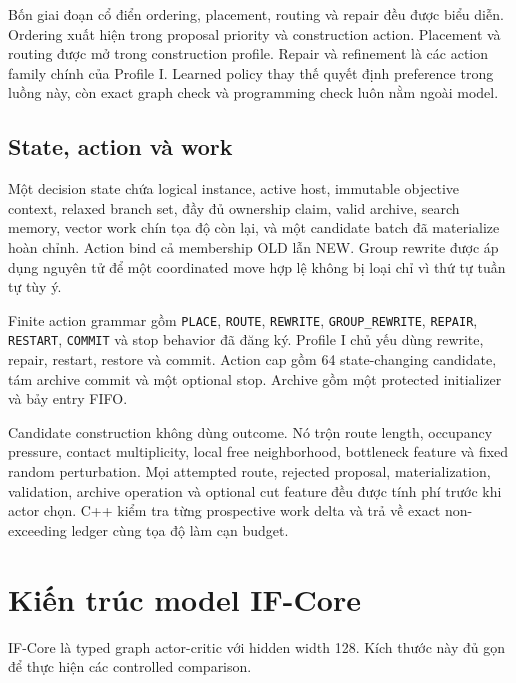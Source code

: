 \documentclass[
  vietnamese,
  10pt,
  a4paper,
]{article}
\begin{document}
Bốn giai đoạn cổ điển ordering, placement, routing và repair đều được
biểu diễn. Ordering xuất hiện trong proposal priority và construction
action. Placement và routing được mở trong construction profile. Repair
và refinement là các action family chính của Profile I. Learned policy
thay thế quyết định preference trong luồng này, còn exact graph check và
programming check luôn nằm ngoài model.

\subsection{State, action và work}\label{state-action-vuxe0-work}

Một decision state chứa logical instance, active host, immutable
objective context, relaxed branch set, đầy đủ ownership claim, valid
archive, search memory, vector work chín tọa độ còn lại, và một
candidate batch đã materialize hoàn chỉnh. Action bind cả membership OLD
lẫn NEW. Group rewrite được áp dụng nguyên tử để một coordinated move
hợp lệ không bị loại chỉ vì thứ tự tuần tự tùy ý.

Finite action grammar gồm \texttt{PLACE}, \texttt{ROUTE},
\texttt{REWRITE}, \texttt{GROUP\_REWRITE}, \texttt{REPAIR},
\texttt{RESTART}, \texttt{COMMIT} và stop behavior đã đăng ký. Profile I
chủ yếu dùng rewrite, repair, restart, restore và commit. Action cap gồm
64 state-changing candidate, tám archive commit và một optional stop.
Archive gồm một protected initializer và bảy entry FIFO.

Candidate construction không dùng outcome. Nó trộn route length,
occupancy pressure, contact multiplicity, local free neighborhood,
bottleneck feature và fixed random perturbation. Mọi attempted route,
rejected proposal, materialization, validation, archive operation và
optional cut feature đều được tính phí trước khi actor chọn. C++ kiểm
tra từng prospective work delta và trả về exact non-exceeding ledger
cùng tọa độ làm cạn budget.

\section{Kiến trúc model IF-Core}\label{kiux1ebfn-truxfac-model-if-core}

IF-Core là typed graph actor-critic với hidden width 128. Kích thước này
đủ gọn để thực hiện các controlled comparison.
\end{document}
